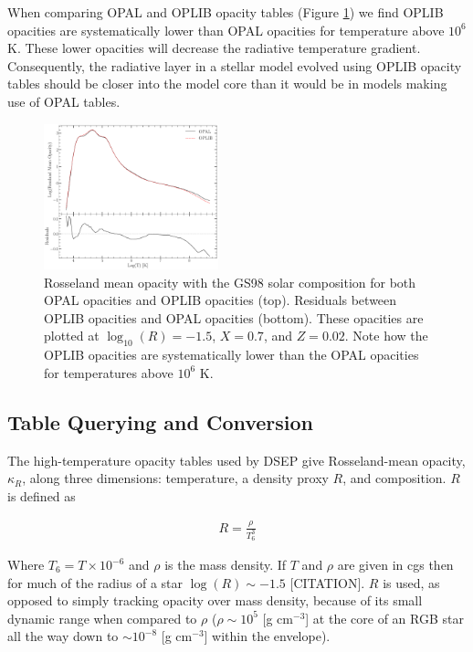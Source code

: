 When comparing OPAL and OPLIB opacity tables (Figure \ref{fig:opacComp}) we
find OPLIB opacities are systematically lower than OPAL opacities for
temperature above $10^{6}$ K. These lower opacities will decrease the radiative
temperature gradient. Consequently, the radiative layer in a stellar model
evolved using OPLIB opacity tables should be closer into the model core than it
would be in models making use of OPAL tables.

\begin{figure}
	\centering
	\includegraphics[width=0.45\textwidth]{src/figures/OpacityComparision.pdf}
	\caption{Rosseland mean opacity with the GS98 solar composition for both
	OPAL opacities and OPLIB opacities (top). Residuals between OPLIB opacities
	and OPAL opacities (bottom). These opacities are plotted at $\log _{10}(R)
	= -1.5$, $X=0.7$, and $Z=0.02$. Note how the OPLIB opacities are
	systematically lower than the OPAL opacities for temperatures above $10^6$
	K.}
	\label{fig:opacComp}
\end{figure}

\subsection{Table Querying and Conversion}
The high-temperature opacity tables used by DSEP give Rosseland-mean opacity,
$\kappa_{R}$, along three dimensions: temperature, a density proxy $R$, and
composition. $R$ is defined as

\begin{align} \label{eqn:Req}
	R = \frac{\rho}{T_{6}^{3}}
\end{align}

Where $T_{6} = T\times10^{-6}$ and $\rho$ is the mass density. If $T$ and
$\rho$ are given in cgs then for much of the radius of a star $\log(R)\sim-1.5$
{\color{red}[CITATION]}.  $R$ is used, as opposed to simply tracking opacity
over mass density, because of its small dynamic range when compared to $\rho$ ($\rho\sim
10^{5}$ [g cm$^{-3}$] at the core of an RGB star all the way down to $\sim
10^{-8}$ [g cm$^{-3}$] within the envelope). 

